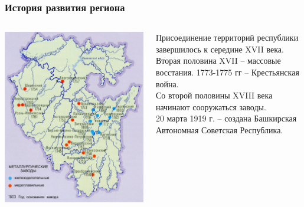 \begin{frame}
\frametitle{История развития региона}
\begin{columns}
\includegraphics[width=1\linewidth]{pics/sasha/factories_18-19}

Присоединение территорий республики завершилось к середине XVII века. \\[10pt]

Вторая половина XVII -- массовые восстания. 1773-1775 гг -- Крестьянская война. \\[10pt]

Со второй половины XVIII века начинают сооружаться заводы. \\[10pt]

20 марта 1919 г. -- создана Башкирская Автономная Советская Республика. 
\end{columns}
\end{frame}

